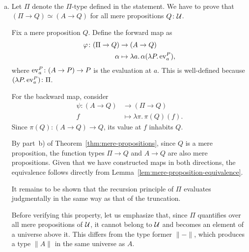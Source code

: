 \begin{solution}${}$
    \begin{enumerate}[a)]
        \item Let $\Pi$ denote the $\Pi$-type defined in the statement. We have to prove that $(\Pi\to Q)\simeq(A\to Q)$ for all mere propositions $Q\colon\univ$.

        Fix a mere proposition $Q$. Define the forward map as
        \begin{align*}
            \varphi\colon(\Pi\to Q)&\to(A\to Q)\\
            \alpha&\mapsto\lambda a.\,\alpha(\lambda P.\,\ev a^P),
        \end{align*}
        where $\ev a^P\colon(A\to P)\to P$ is the evaluation at $a$. This is well-defined because $(\lambda P.\,\ev a^P)\colon\Pi$.
        
        For the backward map, consider
        \begin{align*}
            \psi\colon(A\to Q)&\to(\Pi\to Q)\\
            f&\mapsto\lambda\pi.\,\pi(Q)(f).
        \end{align*}
        Since $\pi(Q)\colon(A\to Q)\to Q$, its value at $f$ inhabits $Q$.

        By part~b) of Theorem~\ref{thm:mere-propositions}, since $Q$ is a mere proposition, the function types $\Pi\to Q$ and $A\to Q$ are also mere propositions. Given that we have constructed maps in both directions, the equivalence follows directly from Lemma~\ref{lem:mere-proposition-equivalence}.
        
        It remains to be shown that the recursion principle of $\Pi$ evaluates judgmentally in the same way as that of the truncation.
        
        Before verifying this property, let us emphasize that, since $\Pi$ quantifies over all mere propositions of $\mathcal U$, it cannot belong to $\mathcal U$ and becomes an element of a universe above it. This differs from the type former $\lVert-\rVert$, which produces a type $\lVert A\rVert$ in the same universe as $A$.
        

\end{enumerate}
\end{solution}
